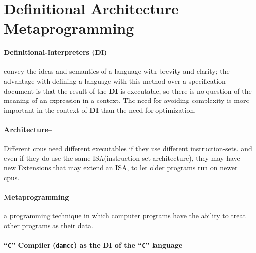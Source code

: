 \hypertarget{definitional-architecture-metaprogramming}{%
\section{Definitional Architecture
Metaprogramming}\label{definitional-architecture-metaprogramming}}

\hypertarget{definitional-interpreters-di}{%
\paragraph{Definitional-Interpreters
(DI)--}\label{definitional-interpreters-di}}

convey the ideas and semantics of a language with brevity and clarity;
the advantage with defining a language with this method over a
specification document is that the result of the \textbf{DI} is
executable, so there is no question of the meaning of an expression in a
context. The need for avoiding complexity is more important in the
context of \textbf{DI} than the need for optimization.

\hypertarget{architecture}{%
\paragraph{Architecture--}\label{architecture}}

Different cpus need different executables if they use different
instruction-sets, and even if they do use the same
ISA(instruction-set-architecture), they may have new Extensions that may
extend an ISA, to let older programs run on newer cpus.

\hypertarget{metaprogramming}{%
\paragraph{Metaprogramming--}\label{metaprogramming}}

a programming technique in which computer programs have the ability to
treat other programs as their data.

\hypertarget{c-compiler-damcc-as-the-di-of-the-c-language}{%
\paragraph{\texorpdfstring{``\texttt{C}'' Compiler (\texttt{damcc}) as
the DI of the ``\texttt{C}'' language
--}{``C'' Compiler (damcc) as the DI of the ``C'' language --}}\label{c-compiler-damcc-as-the-di-of-the-c-language}}

